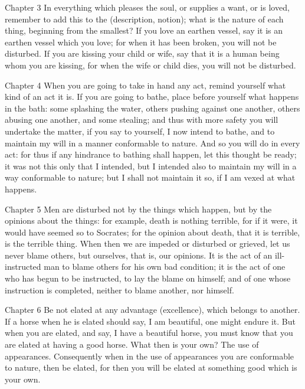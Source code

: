 Chapter 3 In everything which pleases the soul, or supplies a want, or is loved, remember to add this to the (description, notion); what is the nature of each thing, beginning from the smallest? If you love an earthen vessel, say it is an earthen vessel which you love; for when it has been broken, you will not be disturbed. If you are kissing your child or wife, say that it is a human being whom you are kissing, for when the wife or child dies, you will not be disturbed.



Chapter 4 When you are going to take in hand any act, remind yourself what kind of an act it is. If you are going to bathe, place before yourself what happens in the bath: some splashing the water, others pushing against one another, others abusing one another, and some stealing; and thus with more safety you will undertake the matter, if you say to yourself, I now intend to bathe, and to maintain my will in a manner conformable to nature. And so you will do in every act: for thus if any hindrance to bathing shall happen, let this thought be ready; it was not this only that I intended, but I intended also to maintain my will in a way conformable to nature; but I shall not maintain it so, if I am vexed at what happens.



Chapter 5 Men are disturbed not by the things which happen, but by the opinions about the things: for example, death is nothing terrible, for if it were, it would have seemed so to Socrates; for the opinion about death, that it is terrible, is the terrible thing. When then we are impeded or disturbed or grieved, let us never blame others, but ourselves, that is, our opinions. It is the act of an ill-instructed man to blame others for his own bad condition; it is the act of one who has begun to be instructed, to lay the blame on himself; and of one whose instruction is completed, neither to blame another, nor himself.



Chapter 6 Be not elated at any advantage (excellence), which belongs to another. If a horse when he is elated should say, I am beautiful, one might endure it. But when you are elated, and say, I have a beautiful horse, you must know that you are elated at having a good horse. What then is your own? The use of appearances. Consequently when in the use of appearances you are conformable to nature, then be elated, for then you will be elated at something good which is your own.



